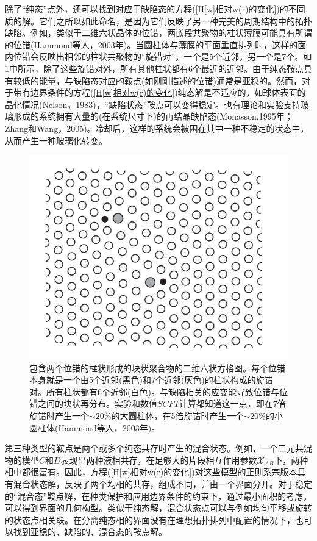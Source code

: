 除了“纯态”点外，还可以找到对应于缺陷态的方程(\ref{H[w]相对w(r)的变化})的不同质的解。它们之所以如此命名，是因为它们反映了另一种完美的周期结构中的拓扑缺陷。例如，类似于二维六状晶体的位错，两嵌段共聚物的柱状薄膜可能具有所谓的位错(Hammond等人，2003年)。当圆柱体与薄膜的平面垂直排列时，这样的面内位错会反映出相邻的柱状共聚物的“旋错对”，一个是5个近邻，另一个是7个。如\ref{方格图}中所示，除了这些旋错对外，所有其他柱状都有6个最近的近邻。由于纯态鞍点具有较低的能量，与缺陷态对应的鞍点(如刚刚描述的位错)通常是亚稳的。然而，对于带有边界条件的方程(\ref{H[w]相对w(r)的变化})纯态解是不适应的，如球体表面的晶化情况(Nelson，1983)，“缺陷状态”鞍点可以变得稳定。也有理论和实验支持玻璃形成的系统拥有大量的(在系统尺寸下)的再结晶缺陷态(Monasson,1995年；Zhang和Wang，2005)。冷却后，这样的系统会被困在其中一种不稳定的状态中，从而产生一种玻璃化转变。\\
\begin{figure}[H]
        \centering
         \includegraphics[width=12cm]{./figures/3.png}
    \caption{包含两个位错的柱状形成的块状聚合物的二维六状方格图。每个位错本身就是一个由5个近邻(黑色)和7个近邻(灰色)的柱状构成的旋错对。所有柱状都有6个近邻(白色)。与缺陷相关的应变能导致位错与位错之间的块状再分布。实验和数值$SCFT$计算都知道这一点，即在7倍旋错时产生一个$\sim 20\%$的大圆柱体，在5倍旋错时产生一个$\sim 20\%$的小圆柱体(Hammond等人，2003年)。} 
           \label{方格图}
\end{figure}


第三种类型的鞍点是两个或多个纯态共存时产生的混合状态。例如，一个二元共混物的模型$C$和$D$表现出两种液相共存，在足够大的片段相互作用参数$\mathcal{X}_{AB}$下，两种相中都很富有。因此，方程(\ref{H[w]相对w(r)的变化})对这些模型的正则系宗版本具有混合状态解，反映了两个均相的共存，组成不同，并由一个界面分开。对于稳定的“混合态”鞍点解，在种类保护和应用边界条件的约束下，通过最小面积的考虑，可以得到界面的几何构型。类似于纯态解，混合状态点可以与例如均匀平移或旋转的状态点相关联。在分离纯态相的界面没有在理想拓扑排列中配置的情况下，也可以找到亚稳的、缺陷的、混合态的鞍点解。\\

